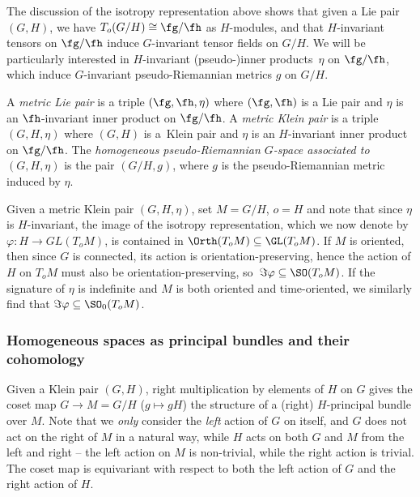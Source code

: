 The discussion of the isotropy representation above shows that given a Lie pair $(G,H)$, we have $T_o(G/H)\cong \fg/\fh$ as $H$-modules, and that $H$-invariant tensors on $\fg/\fh$ induce $G$-invariant tensor fields on $G/H$. We will be particularly interested in $H$-invariant (pseudo-)inner products~$\eta$ on $\fg/\fh$, which induce $G$-invariant pseudo-Riemannian metrics $g$ on $G/H$.

\begin{Definition}A \emph{metric Lie pair} is a triple $(\fg,\fh,\eta)$ where $(\fg,\fh)$ is a Lie pair and $\eta$ is an $\fh$-invariant inner product on $\fg/\fh$.
A \emph{metric Klein pair} is a triple $(G,H,\eta)$ where $(G,H)$ is a~Klein pair and $\eta$ is an $H$-invariant inner product on $\fg/\fh$.
The \emph{homogeneous pseudo-Riemannian $G$-space associated to $(G,H,\eta)$} is the pair $(G/H,g)$, where $g$ is the pseudo-Riemannian metric induced by $\eta$.
\end{Definition}

Given a metric Klein pair $(G,H,\eta)$, set $M=G/H$, $o=H$ and note that since $\eta$ is $H$-invariant, the image of the isotropy representation, which we now denote by $\varphi\colon H\to GL(T_oM)$, is contained in $\Orth(T_oM)\subseteq\GL(T_oM)$. If $M$ is oriented, then since $G$ is connected, its action is orientation-preserving, hence the action of $H$ on $T_oM$ must also be orientation-preserving, so~${\Im\varphi\subseteq\SO(T_oM)}$. If the signature of $\eta$ is indefinite and $M$ is both oriented and time-oriented, we similarly find that $\Im\varphi\subseteq\SO_0(T_oM)$.

\subsubsection{Homogeneous spaces as principal bundles and their cohomology}
\label{sec:homog-spaces-principal-bundles}


Given a Klein pair $(G,H)$, right multiplication by elements of $H$ on $G$ gives the coset map $G\to M=G/H$ ($g\mapsto gH$) the structure of a (right) $H$-principal bundle over $M$. Note that we \emph{only} consider the \emph{left} action of $G$ on itself, and $G$ does not act on the right of $M$ in a natural way, while $H$ acts on both $G$ and $M$ from the left and right -- the left action on $M$ is non-trivial, while the right action is trivial. The coset map is equivariant with respect to both the left action of $G$ and the right action of $H$.

